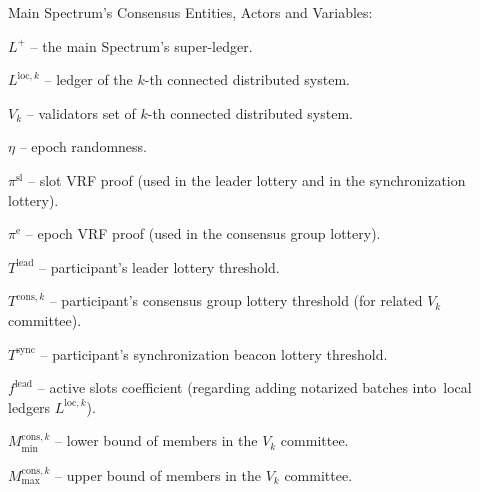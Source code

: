 \noindent
Main Spectrum's Consensus Entities, Actors and Variables:
\begin{legal}
    \item[] $L^+$ -- the main Spectrum's super-ledger.
    \item[] $L^{\text{loc}, k}$ -- ledger of the $k$-th connected distributed system.
    \item[] $V_k$ -- validators set of $k$-th connected distributed system.
    \item[] $\eta$ -- epoch randomness.
    \item[] $\pi^{\text{sl}}$ -- slot VRF proof (used in the leader lottery and in the synchronization lottery).
    \item[] $\pi^{\text{e}}$ -- epoch VRF proof (used in the consensus group lottery).
    \item[] $T^{\text{lead}}$ -- participant's leader lottery threshold.
    \item[] $T^{\text{cons},k}$ -- participant's consensus group lottery threshold (for related $V_k$ committee).
    \item[] $T^{\text{sync}}$ -- participant's synchronization beacon lottery threshold.
    \item[] $f^{\text{lead}}$ -- active slots coefficient (regarding adding notarized batches into\
    local ledgers $L^{\text{loc}, k}$).
    \item[] $M^{\text{cons}, k}_{\min}$ -- lower bound of members in the $V_k$ committee.
    \item[] $M^{\text{cons}, k}_{\max}$ -- upper bound of members in the $V_k$ committee.
\end{legal}